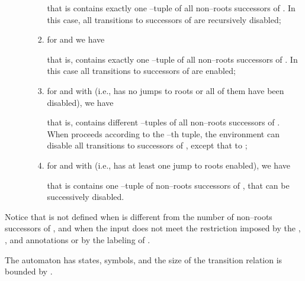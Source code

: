 \documentclass{LMCS}
\theoremstyle{plain}
\begin{document}
\begin{enumerate}[]
\begin{enumerate}[]
\begin{enumerate}[]
that is  contains exactly one --tuple of
all non--roots successors of . In this case, all transitions to
successors of  are recursively disabled;

\item
for  and  we have
    
that is,  contains exactly one --tuple of
all non--roots successors of . In this case all transitions to
successors of  are enabled;

\item
for  and  with  (i.e.,  has no jumps to roots or all of them
have been disabled), we have

that is,  contains  different --tuples
of all non--roots successors of . When  proceeds
according to the --th tuple, the environment can disable all
transitions to successors of , except that to ;

\item
for  and  with  (i.e.,  has at least one jump to roots
enabled), we have
    
that is  contains one --tuple of
non--roots successors of , that can be successively disabled.
\end{enumerate}
\end{enumerate}
\end{enumerate}

Notice that  is not defined when  is different from the
number of non--roots successors of , and when the input does
not meet the restriction imposed by the , , and
 annotations or by the labeling of .

The automaton  has  states,  symbols, and the size of the transition relation
 is bounded by .
\end{document}
